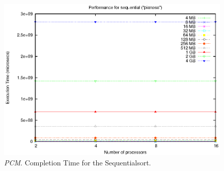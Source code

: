 \begin{figure}[t]
	\begin{center}
		\includegraphics[scale=0.6]{plots/test_01_pianosa/NxTxM/sequential_pianosa_NxTxM}
	\end{center}
  	\caption{\textit{PCM}. Completion Time for the Sequentialsort.}
  	\label{sequential-PCM}
\end{figure}

